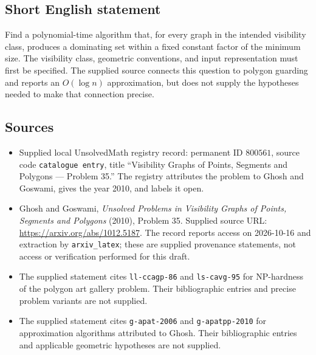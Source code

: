 \documentclass[11pt]{article}
\begin{document}
\subsection{Short English statement}
Find a polynomial-time algorithm that, for every graph in the intended visibility class, produces a dominating set within a fixed constant factor of the minimum size. The visibility class, geometric conventions, and input representation must first be specified. The supplied source connects this question to polygon guarding and reports an \(O(\log n)\) approximation, but does not supply the hypotheses needed to make that connection precise.
\subsection{Sources}
\begin{itemize}
\item Supplied local UnsolvedMath registry record: permanent ID \(800561\), source code \texttt{catalogue entry}, title ``Visibility Graphs of Points, Segments and Polygons --- Problem 35.'' The registry attributes the problem to Ghosh and Goswami, gives the year 2010, and labels it open.
\item Ghosh and Goswami, \emph{Unsolved Problems in Visibility Graphs of Points, Segments and Polygons} (2010), Problem 35. Supplied source URL: \url{https://arxiv.org/abs/1012.5187}. The record reports access on 2026-10-16 and extraction by \texttt{arxiv\_latex}; these are supplied provenance statements, not access or verification performed for this draft.
\item The supplied statement cites \texttt{ll-ccagp-86} and \texttt{ls-cavg-95} for NP-hardness of the polygon art gallery problem. Their bibliographic entries and precise problem variants are not supplied.
\item The supplied statement cites \texttt{g-apat-2006} and \texttt{g-apatpp-2010} for approximation algorithms attributed to Ghosh. Their bibliographic entries and applicable geometric hypotheses are not supplied.
\end{itemize}
\end{document}

